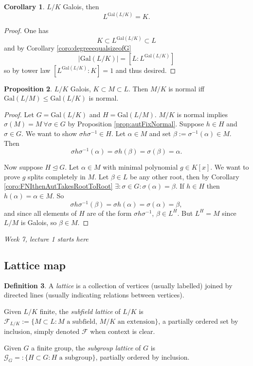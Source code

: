 \documentclass[a4paper]{article}
\newcommand{\gal}{\text{Gal}}
\theoremstyle{definition}
\newtheorem{defn}{Definition}[subsection]
\newtheorem{prop}[defn]{Proposition}
\newtheorem{coro}[defn]{Corollary}
\begin{document}
\begin{coro}
$L/K$ Galois, then
\[
L^{\gal(L/K)}=K.
\]
\end{coro}
\begin{proof}
One has
\[
K\subset L^{\gal(L/K)}\subset L
\]
and by Corollary \ref{coro:degreeequalsizeofG}
\[
|\gal(L/K)|=\left[ L:L^{\gal(L/K)} \right]
\]
so by tower law $\left[L^{\gal(L/K)}:K\right]=1$ and thus desired.
\end{proof}

\begin{prop}
\label{prop:normaliffnormal}
$L/K$ Galois, $K\subset M\subset L$. Then $M/K$ is normal iff $\gal(L/M)\leq \gal(L/K)$ is normal.
\end{prop}
\begin{proof}
Let $G=\gal(L/K)$ and $H=\gal(L/M)$. $M/K$ is normal implies $\sigma(M)=M \ \forall \sigma\in G$ by Proposition \ref{prop:autFixNormal}. Suppose $h\in H$ and $\sigma\in G$. We want to show $\sigma h\sigma^{-1}\in H$. Let $\alpha\in M$ and set $\beta:=\sigma^{-1}(\alpha)\in M$. Then
\[
\sigma h \sigma^{-1}(\alpha)=\sigma h(\beta)=\sigma(\beta)=\alpha.
\]

Now suppose $H\unlhd G$. Let $\alpha\in M$ with minimal polynomial $g\in K[x]$. We want to prove $g$ splits completely in $M$. Let $\beta\in L$ be any other root, then by Corollary \ref{coro:FNIthenAutTakesRootToRoot} $\exists:\sigma\in G:\sigma(\alpha)=\beta$. If $h\in H$ then $h(\alpha)=\alpha\in M$. So
\[
\sigma h \sigma^{-1}(\beta)=\sigma h(\alpha)=\sigma(\alpha)=\beta,
\]
and since all elements of $H$ are of the form $\sigma h\sigma^{-1}$, $\beta\in L^H$. But $L^H=M$ since $L/M$ is Galois, so $\beta\in M$.
\end{proof}

\begin{flushright}
\textit{Week 7, lecture 1 starts here}
\end{flushright}

\subsection{Lattice map}
\begin{defn}
A \textit{lattice} is a collection of vertices (usually labelled) joined by directed lines (usually indicating relations between vertices).

Given $L/K$ finite, the \textit{subfield lattice} of $L/K$ is $\mathcal F_{L/K}:=\{M\subset L:M\text{ a subfield, }M/K\text{ an extension}\}$, a partially ordered set by inclusion, simply denoted $\mathcal F$ when context is clear.

Given $G$ a finite group, the \textit{subgroup lattice} of $G$ is $\mathcal G_G=:\{H\subset G:H\text{ a subgroup}\}$, partially ordered by inclusion.
\end{defn}
\end{document}
